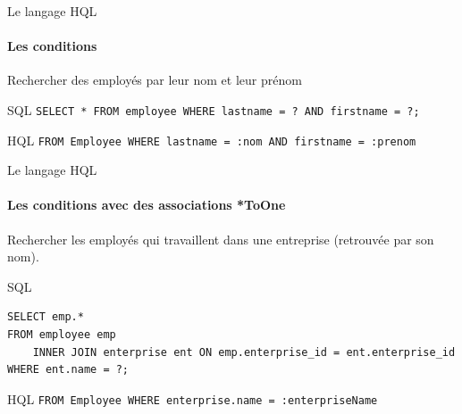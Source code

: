 \documentclass[compress]{beamer}%
\begin{document}
\begin{frame}[fragile]{Le langage HQL}
	\framesubtitle{Les conditions}
	
	\begin{block}{}
		\center
		Rechercher des employés par leur nom et leur prénom
	\end{block}
	
	\begin{exampleblock}{SQL}
		\texttt{SELECT * FROM employee WHERE lastname = ? AND firstname = ?;}
	\end{exampleblock}

	\pause
	\begin{exampleblock}{HQL}
		\texttt{FROM Employee WHERE lastname = :nom AND firstname = :prenom}
	\end{exampleblock}

\end{frame}


\begin{frame}[fragile]{Le langage HQL}
	\framesubtitle{Les conditions avec des associations *ToOne}
	
	\begin{block}{}
		\center
		Rechercher les employés qui travaillent dans une entreprise (retrouvée par son nom).
	\end{block}
	
	\begin{exampleblock}{SQL}
	\begin{lstlisting}
SELECT emp.*
FROM employee emp
    INNER JOIN enterprise ent ON emp.enterprise_id = ent.enterprise_id
WHERE ent.name = ?;
	\end{lstlisting}
	\end{exampleblock}

	\pause
	\begin{exampleblock}{HQL}
		\texttt{FROM Employee WHERE enterprise.name = :enterpriseName}
	\end{exampleblock}

\end{frame}
\end{document}
